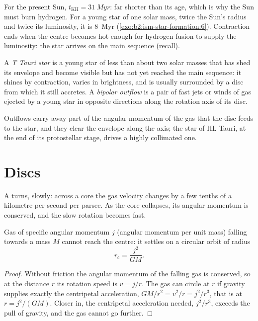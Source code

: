For the present Sun, $t_{\mathrm{KH}} = \qty{31}{Myr}$: far shorter than its
age, which is why the Sun must burn hydrogen. For a young star of one solar
mass, twice the Sun's radius and twice its luminosity, it is \qty{8}{Myr}
(\cref{exo:b2:ism-star-formation:6}). Contraction ends when the centre becomes hot enough for hydrogen fusion to
supply the luminosity: the star arrives on the main sequence (recall).

\begin{definition}\label{def:b2:ism-star-formation:t-tauri}
A \emph{T Tauri star} is a young star of less than about
two solar masses that has shed its envelope and become visible but has not
yet reached the main sequence: it shines by contraction, varies in
brightness, and is usually surrounded by a disc from which it still
accretes. A \emph{bipolar outflow} is a pair of fast
jets or winds of gas ejected by a young star in opposite directions along the
rotation axis of its disc.
\end{definition}

Outflows carry away part of the angular momentum of the gas that the disc
feeds to the star, and they clear the envelope along the axis; the star of
HL Tauri, at the end of its protostellar stage, drives a highly collimated
one.

\section{Discs}

A  turns, slowly: across a core the gas velocity changes by a few
tenths of a kilometre per second per parsec. As the core collapses, its
angular momentum is conserved, and the slow rotation becomes fast.

\begin{proposition}\label{prop:b2:ism-star-formation:centrifugal}
Gas of specific angular momentum $j$ (angular momentum per unit mass)
falling towards a mass $M$ cannot reach the centre: it settles on a circular
orbit of radius
\[
  r_c = \frac{j^2}{G M}.
\]
\end{proposition}

\begin{proof}
Without friction the angular momentum of the falling gas is conserved, so at
the distance $r$ its rotation speed is $v = j/r$. The gas can circle at $r$ if
gravity supplies exactly the centripetal acceleration,
$GM/r^2 = v^2/r = j^2/r^3$, that is at $r = j^2/(GM)$. Closer in, the
centripetal acceleration needed, $j^2/r^3$, exceeds the pull of gravity, and
the gas cannot go further.
\end{proof}


